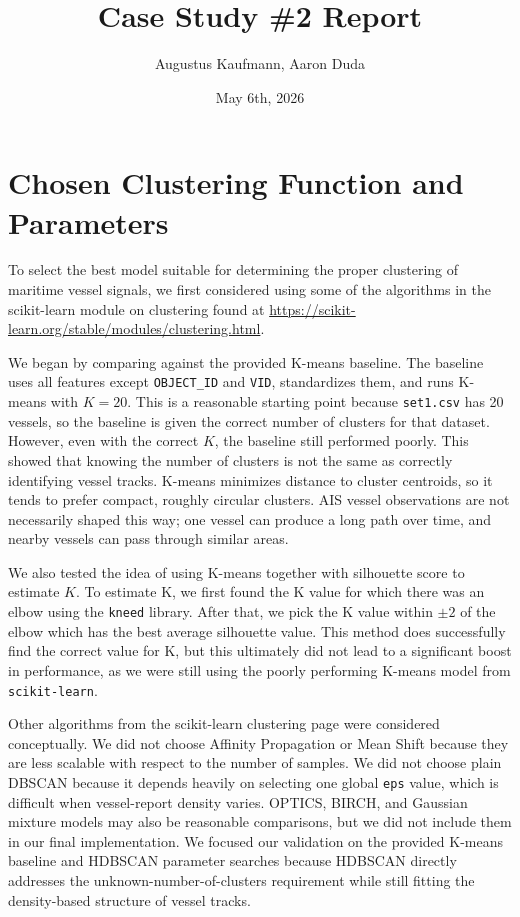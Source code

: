 \documentclass[12pt]{fphw}
\title{Case Study \#2 Report}
\author{Augustus Kaufmann, Aaron Duda}
\date{May 6th, 2026}
\institute{Case Western Reserve Univeristy}
\begin{document}
\maketitle

\section*{Chosen Clustering Function and Parameters}

To select the best model suitable for determining the proper clustering of maritime vessel signals, we first considered using some of the algorithms in the scikit-learn module on
clustering found at \url{https://scikit-learn.org/stable/modules/clustering.html}.

We began by comparing against the provided K-means baseline. The baseline uses all features except \texttt{OBJECT\_ID} and \texttt{VID}, standardizes them, and runs K-means with $K=20$. This is a reasonable starting point because \texttt{set1.csv} has 20 vessels, so the baseline is given the correct number of clusters for that dataset. However, even with the correct $K$, the baseline still performed poorly. This showed that knowing the number of clusters is not the same as correctly identifying vessel tracks. K-means minimizes distance to cluster centroids, so it tends to prefer compact, roughly circular clusters. AIS vessel observations are not necessarily shaped this way; one vessel can produce a long path over time, and nearby vessels can pass through similar areas.

We also tested the idea of using K-means together with silhouette score to estimate $K$. To estimate K, we first found the K value for which there was an elbow using the \texttt{kneed} library. After that, we pick the K value within $\pm 2$ of the elbow which has the best average silhouette value.
This method does successfully find the correct value for K, but this ultimately did not lead to a significant boost in performance, as we were still using the poorly performing K-means model from \texttt{scikit-learn}.

Other algorithms from the scikit-learn clustering page were considered conceptually. We did not choose Affinity Propagation or Mean Shift because they are less scalable with respect to the number of samples. We did not choose plain DBSCAN because it depends heavily on selecting one global \texttt{eps} value, which is difficult when vessel-report density varies. OPTICS, BIRCH, and Gaussian mixture models may also be reasonable comparisons, but we did not include them in our final implementation. We focused our validation on the provided K-means baseline and HDBSCAN parameter searches because HDBSCAN directly addresses the unknown-number-of-clusters requirement while still fitting the density-based structure of vessel tracks.
\end{document}
